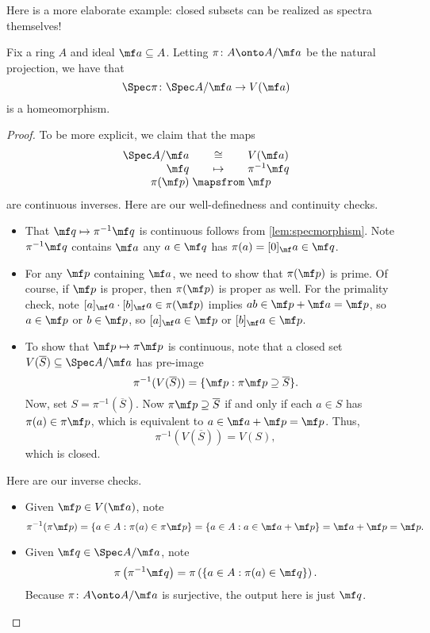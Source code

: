 \documentclass[../notes.tex]{subfiles}
\begin{document}
Here is a more elaborate example: closed subsets can be realized as spectra themselves!
\begin{exe} \label{exe:closedaffinesubscheme}
	Fix a ring $A$ and ideal $\mf a\subseteq A$. Letting $\pi\colon A\onto A/\mf a$ be the natural projection, we have that
	\[{\Spec\pi}\colon\Spec A/\mf a\to V(\mf a)\]
	is a homeomorphism.
\end{exe}
\begin{proof}
	To be more explicit, we claim that the maps
	\[\arraycolsep=1.4pt\begin{array}{rcl}
		\Spec A/\mf a &\cong& V(\mf a) \\
		\mf q &\mapsto& \pi^{-1}\mf q \\
		\pi(\mf p) &\mapsfrom& \mf p
	\end{array}\]
	are continuous inverses. Here are our well-definedness and continuity checks.
	\begin{itemize}
		\item That $\mf q\mapsto\pi^{-1}\mf q$ is continuous follows from \autoref{lem:specmorphism}. Note $\pi^{-1}\mf q$ contains $\mf a$ any $a\in\mf q$ has $\pi(a)=[0]_\mf a\in\mf q$.
		\item For any $\mf p$ containing $\mf a$, we need to show that $\pi(\mf p)$ is prime. Of course, if $\mf p$ is proper, then $\pi(\mf p)$ is proper as well. For the primality check, note $[a]_\mf a\cdot[b]_\mf a\in\pi(\mf p)$ implies $ab\in\mf p+\mf a=\mf p$, so $a\in\mf p$ or $b\in\mf p$, so $[a]_\mf a\in\mf p$ or $[b]_\mf a\in\mf p$.
		\item To show that $\mf p\mapsto\pi\mf p$ is continuous, note that a closed set $V(\overline S)\subseteq\Spec A/\mf a$ has pre-image
		\[\pi^{-1}(V(\overline S))=\{\mf p:\pi\mf p\supseteq\overline S\}.\]
		Now, set $S=\pi^{-1}(\overline S)$. Now $\pi\mf p\supseteq\overline S$ if and only if each $a\in S$ has $\pi(a)\in\pi\mf p$, which is equivalent to $a\in\mf a+\mf p=\mf p$. Thus,
		\[\pi^{-1}(V(\overline S))=V(S),\]
		which is closed.
	\end{itemize}
	Here are our inverse checks.
	\begin{itemize}
		\item Given $\mf p\in V(\mf a)$, note
		\[\pi^{-1}(\pi\mf p)=\{a\in A:\pi(a)\in\pi\mf p\}=\{a\in A:a\in\mf a+\mf p\}=\mf a+\mf p=\mf p.\]
		\item Given $\mf q\in\Spec A/\mf a$, note
		\[\pi\left(\pi^{-1}\mf q\right)=\pi\left(\{a\in A:\pi(a)\in\mf q\}\right).\]
		Because $\pi\colon A\onto A/\mf a$ is surjective, the output here is just $\mf q$.
		\qedhere
	\end{itemize}
\end{proof}
\end{document}
